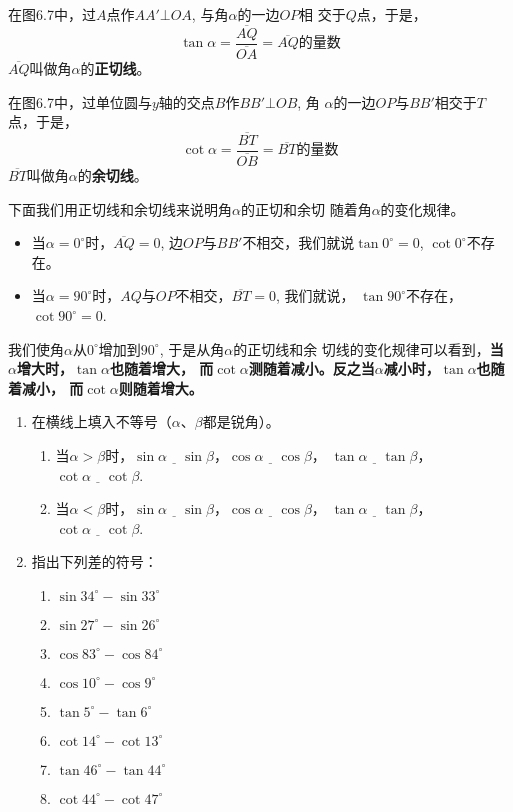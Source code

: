 在图6.7中，过$A$点作$AA'\bot OA$, 与角$\alpha$的一边$OP$相
交于$Q$点，于是，
\[\tan\alpha=\frac{\overline{AQ}}{\overline{OA}}=\overline{AQ}\text{的量数}\]
$\overline{AQ}$叫做角$\alpha$的\textbf{正切线}。

在图6.7中，过单位圆与$y$轴的交点$B$作$BB'\bot OB$, 角
$\alpha$的一边$OP$与$BB'$相交于$T$点，于是，
\[\cot\alpha=\frac{\overline{BT}}{\overline{OB}}=\overline{BT}\text{的量数}\]
$\overline{BT}$叫做角$\alpha$的\textbf{余切线}。

下面我们用正切线和余切线来说明角$\alpha$的正切和余切
随着角$\alpha$的变化规律。

\begin{itemize}
    \item 当$\alpha =0^{\circ}$时，$\overline{AQ}=0$, 边$OP$与$BB'$不相交，我们就说$\tan0^{\circ}=0$,
    $\cot 0^{\circ}$不存在。
    \item 当$\alpha =90^{\circ}$时，$AQ$与$OP$不相交，$\overline{BT}=0$, 
    我们就说，
    $\tan90^{\circ}$不存在，
    $\cot 90^{\circ}=0$.
\end{itemize}

我们使角$\alpha$从$0^{\circ}$增加到$90^{\circ}$, 于是从角$\alpha$的正切线和余
切线的变化规律可以看到，\textbf{当$\alpha$增大时，$\tan\alpha$也随着增大，
而$\cot\alpha$测随着减小。反之当$\alpha$减小时，$\tan\alpha$也随着减小，
而$\cot\alpha$则随着增大。}


\begin{ex}
\begin{enumerate}
    \item 在横线上填入不等号（$\alpha$、$\beta$都是锐角）。
    \begin{enumerate}
    \item 当$\alpha>\beta$时，$\sin\alpha\underline{\quad}\sin\beta$，$\cos\alpha\underline{\quad}\cos\beta$，
    $\tan\alpha\underline{\quad}\tan\beta$，$\cot\alpha\underline{\quad}\cot\beta$.
    \item 当$\alpha<\beta$时，$\sin\alpha\underline{\quad}\sin\beta$，$\cos\alpha\underline{\quad}\cos\beta$，
    $\tan\alpha\underline{\quad}\tan\beta$，$\cot\alpha\underline{\quad}\cot\beta$.
    \end{enumerate}

    \item 指出下列差的符号：
\begin{multicols}{2}
\begin{enumerate}
    \item $\sin34^{\circ}-\sin33^{\circ}$
    \item $ \sin27^{\circ}-\sin26^{\circ}$
    \item $\cos83^{\circ}-\cos84^{\circ}$
    \item $\cos10^{\circ}-\cos9^{\circ}$
    \item $\tan 5^{\circ}-\tan 6^{\circ}$
    \item $\cot 14^{\circ}-\cot 13^{\circ}$
    \item $\tan 46^{\circ}-\tan 44^{\circ}$
    \item $\cot 44^{\circ}-\cot 47^{\circ}$
\end{enumerate}
\end{multicols}
\end{enumerate}
\end{ex}

